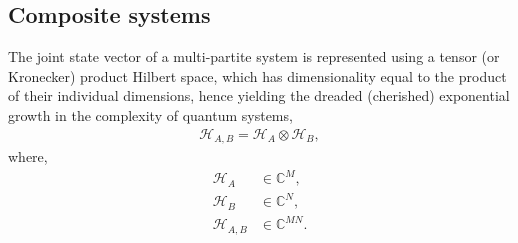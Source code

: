 %
%

\subsection{Composite systems}

The joint state vector of a multi-partite system is represented using a tensor (or Kronecker) product Hilbert space, which has dimensionality equal to the product of their individual dimensions, hence yielding the dreaded (cherished) exponential growth in the complexity of quantum systems,
\begin{align}
\mathcal{H}_{A,B} = \mathcal{H}_A\otimes \mathcal{H}_B,	
\end{align}
where,
\begin{align}
\mathcal{H}_A &\in\mathbb{C}^M,\nonumber\\
\mathcal{H}_B &\in\mathbb{C}^N,\nonumber\\
\mathcal{H}_{A,B} &\in\mathbb{C}^{MN}.	
\end{align}

